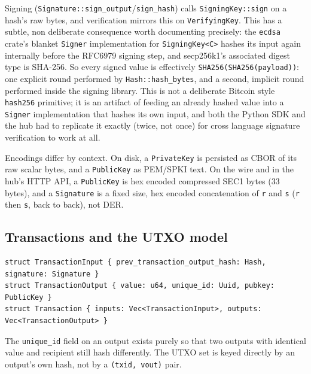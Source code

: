 \documentclass[11pt]{article}
\newcommand{\code}[1]{\texttt{#1}}
\begin{document}
Signing (\code{Signature::sign_output}/\code{sign_hash}) calls \code{SigningKey::sign} on a hash's raw bytes, and verification mirrors this on \code{VerifyingKey}. This has a subtle, non deliberate consequence worth documenting precisely: the \code{ecdsa} crate's blanket \code{Signer} implementation for \code{SigningKey<C>} hashes its input again internally before the RFC6979 signing step, and secp256k1's associated digest type is SHA-256. So every signed value is effectively \code{SHA256(SHA256(payload))}: one explicit round performed by \code{Hash::hash_bytes}, and a second, implicit round performed inside the signing library. This is not a deliberate Bitcoin style \code{hash256} primitive; it is an artifact of feeding an already hashed value into a \code{Signer} implementation that hashes its own input, and both the Python SDK and the hub had to replicate it exactly (twice, not once) for cross language signature verification to work at all.

Encodings differ by context. On disk, a \code{PrivateKey} is persisted as CBOR of its raw scalar bytes, and a \code{PublicKey} as PEM/SPKI text. On the wire and in the hub's HTTP API, a \code{PublicKey} is hex encoded compressed SEC1 bytes (33 bytes), and a \code{Signature} is a fixed size, hex encoded concatenation of \code{r} and \code{s} (\code{r} then \code{s}, back to back), not DER.

\subsection{Transactions and the UTXO model}

\begin{lstlisting}
struct TransactionInput { prev_transaction_output_hash: Hash, signature: Signature }
struct TransactionOutput { value: u64, unique_id: Uuid, pubkey: PublicKey }
struct Transaction { inputs: Vec<TransactionInput>, outputs: Vec<TransactionOutput> }
\end{lstlisting}

The \code{unique_id} field on an output exists purely so that two outputs with identical value and recipient still hash differently. The UTXO set is keyed directly by an output's own hash, not by a \code{(txid, vout)} pair.
\end{document}
